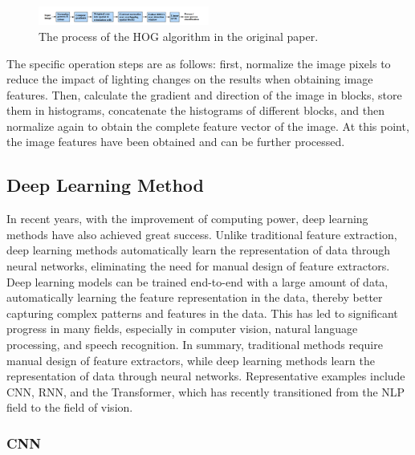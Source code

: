 \documentclass[10pt,twocolumn,letterpaper]{article}
\begin{document}
\begin{figure}
  \centering %
  \includegraphics[width=0.5\textwidth]{image2.png} %
  \caption{The process of the HOG algorithm in the original paper.} %
  \label{fig2}
\end{figure}

The specific operation steps are as follows: first, normalize the image pixels to reduce the impact of lighting changes on the results when obtaining image features. Then, calculate the gradient and direction of the image in blocks, store them in histograms, concatenate the histograms of different blocks, and then normalize again to obtain the complete feature vector of the image. At this point, the image features have been obtained and can be further processed.\cite{exampleblog}
\subsection{Deep Learning Method}

In recent years, with the improvement of computing power, deep learning methods have also achieved great success. Unlike traditional feature extraction, deep learning methods automatically learn the representation of data through neural networks, eliminating the need for manual design of feature extractors. Deep learning models can be trained end-to-end with a large amount of data, automatically learning the feature representation in the data, thereby better capturing complex patterns and features in the data. This has led to significant progress in many fields, especially in computer vision, natural language processing, and speech recognition. In summary, traditional methods require manual design of feature extractors, while deep learning methods learn the representation of data through neural networks. Representative examples include CNN\cite{Alpher04}, RNN\cite{Alpher05}, and the Transformer\cite{vaswani2017attention}, which has recently transitioned from the NLP field to the field of vision.

\subsubsection{CNN}
\end{document}

